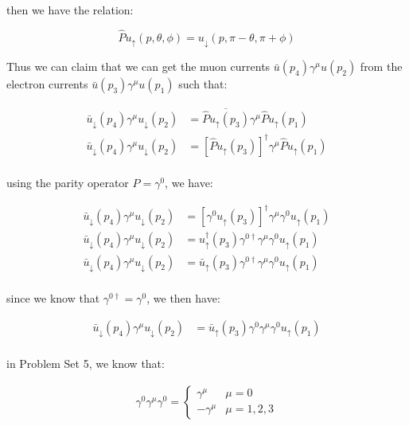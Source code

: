 \documentclass[11pt]{article}
\theoremstyle{definition}
\begin{document}
then we have the relation:

\begin{equation}
\boxed{
    \hat{P}u_{\uparrow}(p,\theta,\phi) =  u_{\downarrow}(p,\pi-\theta,\pi+\phi)
}
\end{equation}

Thus we can claim that we can get the muon currents $\bar{u}(p_4) \gamma^{\mu} u(p_2)$ from the electron currents $\bar{u}(p_3) \gamma^{\mu} u(p_1)$ such that:

\begin{align}
    \bar{u}_{\downarrow}(p_4) \gamma^{\mu} u_{\downarrow}(p_2) &= \overline{\hat{P}  u_{\uparrow}(p_3)} \gamma^{\mu} \hat{P} u_{\uparrow}(p_1)\\
    \bar{u}_{\downarrow}(p_4) \gamma^{\mu} u_{\downarrow}(p_2) &= [\hat{P}  u_{\uparrow}(p_3)]^{\dagger} \gamma^{\mu} \hat{P} u_{\uparrow}(p_1)\\
\end{align}

using the parity operator $\hat{P} = \gamma^{0}$, we have:

\begin{align}
    \bar{u}_{\downarrow}(p_4) \gamma^{\mu} u_{\downarrow}(p_2) &= [\gamma^{0} u_{\uparrow}(p_3)]^{\dagger} \gamma^{\mu} \gamma^0 u_{\uparrow}(p_1)\\
    \bar{u}_{\downarrow}(p_4) \gamma^{\mu} u_{\downarrow}(p_2) &= u_{\uparrow}^{\dagger}(p_3)\gamma^{0\dagger} \gamma^{\mu} \gamma^0 u_{\uparrow}(p_1)\\
    \bar{u}_{\downarrow}(p_4) \gamma^{\mu} u_{\downarrow}(p_2) &= \bar{u}_{\uparrow}(p_3)\gamma^{0\dagger} \gamma^{\mu} \gamma^0 u_{\uparrow}(p_1)\\
\end{align}

since we know that $\gamma^{0\dagger} = \gamma^{0}$, we then have:

\begin{align}
    \bar{u}_{\downarrow}(p_4) \gamma^{\mu} u_{\downarrow}(p_2) &= \bar{u}_{\uparrow}(p_3)\gamma^{0} \gamma^{\mu} \gamma^0 u_{\uparrow}(p_1)\\
\end{align}

in Problem Set 5, we know that:

\begin{align}
    \gamma^0\gamma^{\mu}\gamma^0  =
    \begin{cases}
        \gamma^{\mu} & \mu = 0\\
        -\gamma^{\mu} & \mu = 1,2,3
    \end{cases}
\end{align}
\end{document}
